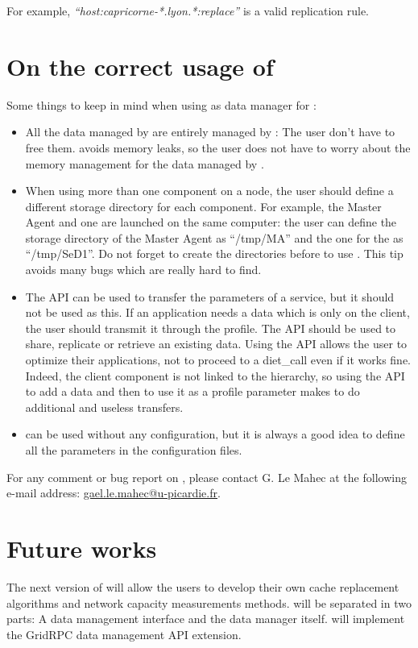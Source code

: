 For example, \textit{``host:capricorne-*.lyon.*:replace''} is a valid
replication rule.

\section{On the correct usage of \dagda}
Some things to keep in mind when using \dagda as data manager for
\diet:
\begin{itemize}
\item All the data managed by \dagda are entirely managed by \dagda:
  The user don't have to free them. \dagda avoids memory leaks, so the user
  does not have to worry about the memory management for the data
  managed by \dagda.
\item When using more than one \dagda component on a node, the user
  should define a different storage directory for each component. For
  example, the Master Agent and one \sed are launched on the same
  computer: the user can define the storage directory of the Master
  Agent as ``/tmp/MA'' and the one for the \sed as ``/tmp/SeD1''. Do
  not forget to create the directories before to use \dagda. This tip
  avoids many bugs which are really hard to find.
\item The \dagda API can be used to transfer the parameters of a
  service, but it should not be used as this. If an application needs
  a data which is only on the client, the user should transmit it
  through the profile.  The \dagda API should be used to share,
  replicate or retrieve an existing data. Using the API allows the
  user to optimize their applications, not to proceed to a diet\_call
  even if it works fine. Indeed, the \dagda client component is not
  linked to the \diet hierarchy, so using the API to add a data and
  then to use it as a profile parameter makes \dagda to do additional
  and useless transfers.
\item \dagda can be used without any configuration, but it is always
  a good idea to define all the \dagda parameters in the configuration
  files.
\end{itemize}

For any comment or bug report on \dagda, please contact G. Le Mahec at
the following e-mail address: \url{gael.le.mahec@u-picardie.fr}.

\section{Future works}
The next version of \dagda will allow the users to develop their own
cache replacement algorithms and network capacity measurements
methods. \dagda will be separated in two parts: A data management
interface and the \dagda data manager itself. \dagda will implement
the GridRPC data management API extension.

